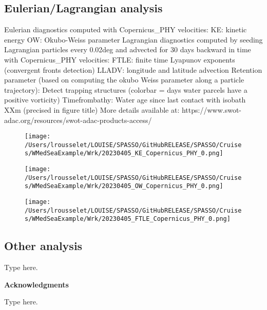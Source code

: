 \documentclass{article}%
\begin{document}
%
\clearpage

%
\subsection{Eulerian/Lagrangian analysis}%
\label{subsec:Eulerian/Lagrangiananalysis}%
Eulerian diagnostics computed with Copernicus\_PHY velocities:\newline%
 KE: kinetic energy \newline%
 OW: Okubo{-}Weiss parameter\newline%
\newline%
%
 Lagrangian diagnostics computed by seeding Lagrangian particles every 0.02deg and advected for 30 days backward in time with Copernicus\_PHY velocities:\newline%
FTLE: finite time Lyapunov exponents (convergent fronts detection)\newline%
LLADV: longitude and latitude advection\newline%
Retention parameter (based on computing the okubo Weiss parameter along a particle trajectory): Detect trapping structures (colorbar = days water parcels have a positive vorticity)\newline%
Timefrombathy: Water age since last contact with isobath XXm (precised in figure title)\newline%
\newline%
More details available at: https://www.swot{-}adac.org/resources/swot{-}adac{-}products{-}access/ \newline%
\newline%
%


\begin{figure}[h!]%
\centering%
\texttt{[image: /Users/lrousselet/LOUISE/SPASSO/GitHubRELEASE/SPASSO/Cruises/WMedSeaExample/Wrk/20230405\_KE\_Copernicus\_PHY\_0.png]}%
\end{figure}

%


\begin{figure}[h!]%
\centering%
\texttt{[image: /Users/lrousselet/LOUISE/SPASSO/GitHubRELEASE/SPASSO/Cruises/WMedSeaExample/Wrk/20230405\_OW\_Copernicus\_PHY\_0.png]}%
\end{figure}

%


\begin{figure}[h!]%
\centering%
\texttt{[image: /Users/lrousselet/LOUISE/SPASSO/GitHubRELEASE/SPASSO/Cruises/WMedSeaExample/Wrk/20230405\_FTLE\_Copernicus\_PHY\_0.png]}%
\end{figure}

%
\clearpage

%
\subsection{Other analysis}%
\label{subsec:Otheranalysis}%
Type here.

%
\begin{center}%
\textbf{Acknowledgments}%
\end{center}%
Type here.%
\end{document}
